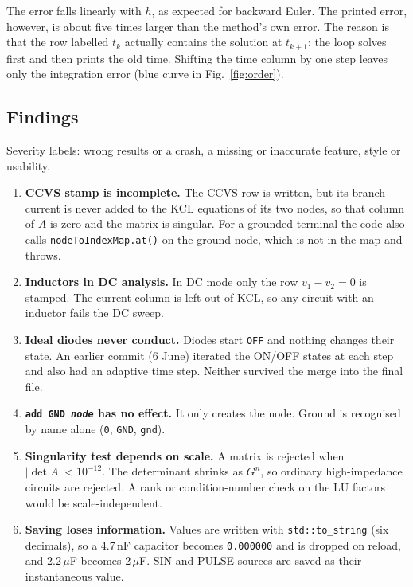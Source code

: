 The error falls linearly with $h$, as expected for backward Euler. The printed error, however, is
about five times larger than the method's own error. The reason is that the row labelled $t_k$
actually contains the solution at $t_{k+1}$: the loop solves first and then prints the old time.
Shifting the time column by one step leaves only the integration error (blue curve in Fig.~\ref{fig:order}).

\subsection{Findings}\label{sec:p1find}
Severity labels:  wrong results or a crash,  a missing or inaccurate feature,  style or usability.
\begin{enumerate}[leftmargin=2em]
  \item {} \textbf{CCVS stamp is incomplete.} The CCVS row is written, but its branch current is never
    added to the KCL equations of its two nodes, so that column of $A$ is zero and the matrix is singular.
    For a grounded terminal the code also calls \texttt{nodeToIndexMap.at()} on the ground node, which
    is not in the map and throws.
  \item {} \textbf{Inductors in DC analysis.} In DC mode only the row $v_1-v_2=0$ is stamped. The current
    column is left out of KCL, so any circuit with an inductor fails the DC sweep.
  \item {} \textbf{Ideal diodes never conduct.} Diodes start \texttt{OFF} and nothing changes their state.
    An earlier commit (6 June) iterated the ON/OFF states at each step and also had an adaptive time step.
    Neither survived the merge into the final file.
  \item {} \textbf{\texttt{add GND \textit{node}} has no effect.} It only creates the node. Ground is recognised by
    name alone (\texttt{0}, \texttt{GND}, \texttt{gnd}).
  \item {} \textbf{Singularity test depends on scale.} A matrix is rejected when $|\det A|<10^{-12}$. The determinant
    shrinks as $G^n$, so ordinary high-impedance circuits are rejected. A rank or condition-number check on
    the LU factors would be scale-independent.
  \item {} \textbf{Saving loses information.} Values are written with \texttt{std::to\_string} (six decimals), so a
    4.7\,nF capacitor becomes \texttt{0.000000} and is dropped on reload, and 2.2\,$\mu$F becomes 2\,$\mu$F. SIN and
    PULSE sources are saved as their instantaneous value.

\end{enumerate}
